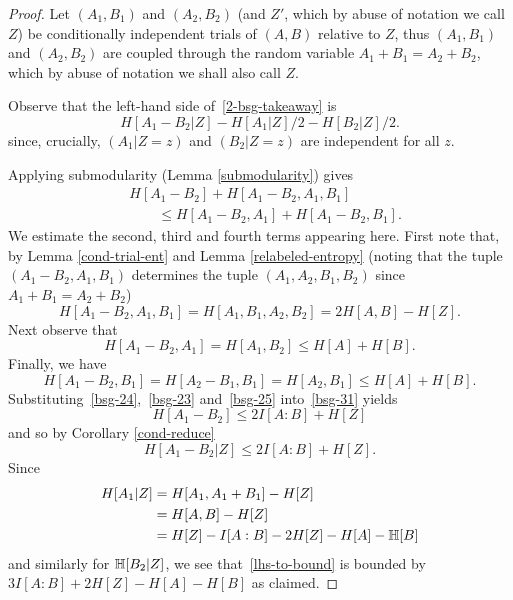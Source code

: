 \begin{proof}
Let $(A_1, B_1)$ and $(A_2, B_2)$ (and $Z'$, which by abuse of notation we call $Z$) be conditionally independent trials of $(A,B)$ relative to $Z$, thus $(A_1,B_1)$ and $(A_2,B_2)$ are coupled through the random variable $A_1 + B_1 = A_2 + B_2$, which by abuse of notation we shall also call $Z$.

Observe that the left-hand side of~\eqref{2-bsg-takeaway} is
\begin{equation}\label{lhs-to-bound}
H[A_1 - B_2| Z] - H[A_1 | Z]/2 - H[B_2 | Z]/2.
\end{equation}
since, crucially, $(A_1 | Z=z)$ and $(B_2 | Z=z)$ are independent for all $z$.

Applying submodularity (Lemma \ref{submodularity}) gives
\begin{equation}\label{bsg-31} \begin{split}
&H[A_1 - B_2] + H[A_1 - B_2, A_1, B_1] \\
&\qquad \leq H[A_1 - B_2, A_1] + H[A_1 - B_2,B_1].
\end{split}\end{equation}
We estimate the second, third and fourth terms appearing here.
First note that, by Lemma \ref{cond-trial-ent} and Lemma \ref{relabeled-entropy} (noting that the tuple $(A_1 - B_2, A_1, B_1)$  determines the tuple $(A_1, A_2, B_1, B_2)$ since $A_1+B_1=A_2+B_2$)
\begin{equation}\label{bsg-24} H[A_1 - B_2, A_1, B_1] = H[A_1, B_1, A_2, B_2] = 2H[A,B] - H[Z].\end{equation}
Next observe that
\begin{equation}\label{bsg-23} H[A_1 - B_2, A_1] = H[A_1, B_2] \leq H[A] + H[B].
\end{equation}
Finally, we have
\begin{equation}\label{bsg-25} H[A_1 - B_2, B_1] = H[A_2 - B_1, B_1] = H[A_2, B_1] \leq H[A] + H[B].\end{equation}
Substituting~\eqref{bsg-24},~\eqref{bsg-23} and~\eqref{bsg-25} into~\eqref{bsg-31} yields
\[ H[A_1 - B_2] \leq 2I[A:B] + H[Z]\] and so by Corollary \ref{cond-reduce}
\[H[A_1 - B_2 | Z]  \leq 2I[A:B] + H[Z].\]
Since
\begin{align*} H[A_1 | Z] & = H[A_1, A_1 + B_1] - H[Z] \\ & = H[A,B] - H[Z] \\ & = H[Z] - I[A:B] - 2 H[Z]-H[A]-\mathbb{H}[B]\end{align*}
and similarly for $\mathbb{H}[B_2 | Z]$, we see that~\eqref{lhs-to-bound} is bounded by
$3I[A:B] + 2H[Z]-H[A]-H[B]$ as claimed.
\end{proof}
